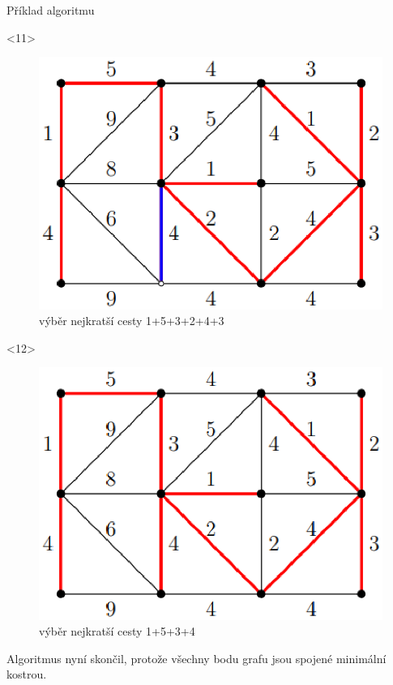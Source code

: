 \documentclass[pdf]{beamer}
\begin{document}
\begin{centering}
\begin{frame}{Příklad algoritmu}
    \begin{onlyenv}<11>
        \begin{figure}[h!]
        \includegraphics[scale=0.5]{obr11.eps}
        \caption{\label{fig:obr11}výběr nejkratší cesty 1+5+3+2+4+3}
        \end{figure}
    \end{onlyenv}
    
    \begin{onlyenv}<12>
        \begin{figure}[h!]
        \includegraphics[scale=0.5]{obr12.eps}
        \caption{\label{fig:obr12}výběr nejkratší cesty 1+5+3+4}
        \end{figure}
        Algoritmus nyní skončil, protože všechny bodu grafu jsou spojené minimální kostrou.    \end{onlyenv}

\end{frame}
\end{centering}  
\end{document}
